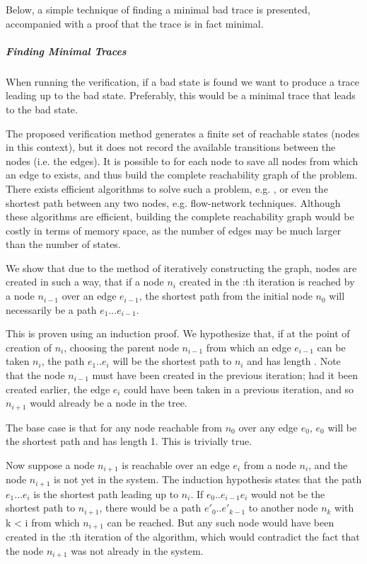 Below, a simple technique of finding a minimal bad trace is presented, accompanied with a proof that the trace is in fact minimal.

\subparagraph{Finding Minimal Traces}
When running the verification, if a bad state is found we want to produce a trace leading up to the bad state. Preferably, this would be a minimal trace that leads to the bad state.

The proposed verification method generates a finite set of reachable states (nodes in this context), but it does not record the available transitions between the nodes (i.e. the edges). It is possible to for each node  to save all nodes  from which an edge to  exists, and thus build the complete reachability graph of the problem. There exists efficient algorithms to solve such a problem, e.g. , or even the shortest path between any two nodes, e.g. flow-network techniques. Although these algorithms are efficient, building the complete reachability graph would be costly in terms of memory space, as the number of edges may be much larger than the number of states.


We show that due to the method of iteratively constructing the graph, nodes are created in such a way, that if a node $n_{i}$ created in the :th iteration is reached by a node $n_{i-1}$ over an edge $e_{i-1}$, the shortest path from the initial node $n_0$ will necessarily be a path $e_1...e_{i-1}$.

 This is proven using an induction proof. We hypothesize that, if at the point of creation of $n_i$, choosing the parent node $n_{i-1}$ from which an edge $e_{i-1}$ can be taken $n_i$, the path $e_1..e_{i}$ will be the shortest path to $n_i$ and has length . Note that the node $n_{i-1}$ must have been created in the previous iteration; had it been created earlier, the edge $e_i$ could have been taken in a previous iteration, and so $n_{i+1}$ would already be a node in the tree.

The base case is that for any node reachable from $n_0$ over any edge $e_0$, $e_0$ will be the shortest path and has length 1. This is trivially true.

Now suppose a node $n_{i+1}$ is reachable over an edge $e_i$ from a node $n_i$, and the node $n_{i+1}$ is not yet in the system. The induction hypothesis states that the path $e_1...e_i$ is the shortest path leading up to $n_i$. If $e_0..e_{i-1}e_i$ would not be the shortest path to $n_{i+1}$, there would be a path $e'_0..e'_{k-1}$ to another node $n_k$ with k < i from which $n_{i+1}$ can be reached. But any such node would have been created in the :th iteration of the algorithm, which would contradict the fact that the node $n_{i+1}$ was not already in the system.

